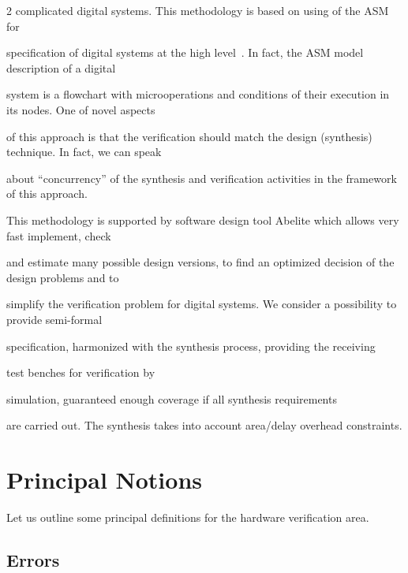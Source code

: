 \begin{multicols}{2}
complicated digital systems. This methodology is based on using of the ASM for


specification of digital systems at the high level~\cite{5bar}. In fact, the ASM model description of a digital


system is a flowchart with microoperations and conditions of their execution in its nodes. One of novel aspects


of this approach is that the verification should match the design (synthesis) technique. In fact, we can speak


about ``concurrency'' of the synthesis and verification activities in the framework of this approach.








    This methodology is supported by software design tool Abelite which allows very fast implement, check


and estimate many possible design versions, to find an optimized decision of the design problems and to


simplify the verification problem for digital systems. We consider a possibility to provide semi-formal


specification, harmonized with the synthesis process, providing the receiving


test benches for verification by


simulation, guaranteed enough coverage if all synthesis requirements


are carried out. The synthesis takes into account area/delay overhead constraints.





\section{Principal Notions}





   \noindent


Let us outline some principal definitions for the hardware verification area.





\subsection{Errors} %






\end{multicols}
